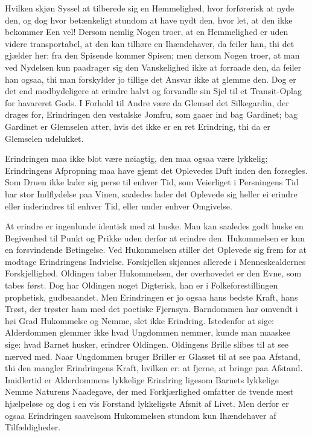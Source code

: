 \documentclass[12pt,a4paper]{article}
\begin{document}
Hvilken skjøn Syssel at tilberede sig en Hemmelighed, hvor forførerisk at nyde den, og dog hvor betænkeligt stundom at have nydt den, hvor let, at den ikke bekommer Een vel! Dersom nemlig Nogen troer, at en Hemmelighed er uden videre transportabel, at den kan tilhøre en Ihændehaver, da feiler han, thi det gjælder her: fra den Spisende kommer Spisen; men dersom Nogen troer, at man ved Nydelsen kun paadrager sig den Vanskelighed ikke at forraade den, da feiler han ogsaa, thi man forskylder jo tillige det Ansvar ikke at glemme den. Dog er det end modbydeligere at erindre halvt og forvandle sin Sjel til et Transit-Oplag for havareret Gods. I Forhold til Andre være da Glemsel det Silkegardin, der drages for, Erindringen den vestalske Jomfru, som gaaer ind bag Gardinet; bag Gardinet er Glemselen atter, hvis det ikke er en ret Erindring, thi da er Glemselen udelukket.

Erindringen maa ikke blot være nøiagtig, den maa ogsaa være lykkelig; Erindringens Afpropning maa have gjemt det Oplevedes Duft inden den forsegles. Som Druen ikke lader sig perse til enhver Tid, som Veierliget i Persningens Tid har stor Indflydelse paa Vinen, saaledes lader det Oplevede sig heller ei erindre eller inderindres til enhver Tid, eller under enhver Omgivelse.

At erindre er ingenlunde identisk med at huske. Man kan saaledes godt huske en Begivenhed til Punkt og Prikke uden derfor at erindre den. Hukommelsen er kun en forsvindende Betingelse. Ved Hukommelsen stiller det Oplevede sig frem for at modtage Erindringens Indvielse. Forskjellen skjønnes allerede i Menneskealdernes Forskjellighed. Oldingen taber Hukommelsen, der overhovedet er den Evne, som tabes først. Dog har Oldingen noget Digterisk, han er i Folkeforestillingen prophetisk, gudbeaandet. Men Erindringen er jo ogsaa hans bedste Kraft, hans Trøst, der trøster ham med det poetiske Fjernsyn. Barndommen har omvendt i høi Grad Hukommelse og Nemme, slet ikke Erindring. Istedenfor at sige: Alderdommen glemmer ikke hvad Ungdommen nemmer, kunde man maaskee sige: hvad Barnet husker, erindrer Oldingen. Oldingens Brille slibes til at see nærved med. Naar Ungdommen bruger Briller er Glasset til at see paa Afstand, thi den mangler Erindringens Kraft, hvilken er: at fjerne, at bringe paa Afstand. Imidlertid er Alderdommens lykkelige Erindring ligesom Barnets lykkelige Nemme Naturens Naadegave, der med Forkjærlighed omfatter de tvende mest hjælpeløse og dog i en vis Forstand lykkeligste Afsnit af Livet. Men derfor er ogsaa Erindringen saavelsom Hukommelsen stundom kun Ihændehaver af Tilfældigheder.
\end{document}
